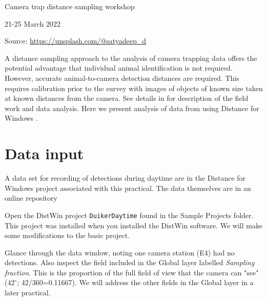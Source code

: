 \documentclass[a4paper, 10pt]{article}
\begin{document}
\phantom{a}

\vspace{4.7cm}

{\Large Camera trap distance sampling workshop}

{\large 21-25 March 2022}

\begin{flushright}
\tiny{Source: \url{https://unsplash.com/@satyadeep_d}}
\end{flushright}

%
{%
}

A distance sampling approach to the analysis of camera trapping data offers the potential advantage that individual animal identification is not required. However, accurate animal-to-camera detection distances are required. This requires calibration prior to the survey with images of objects of known size taken at known distances from the camera. See details in \citep{howeetal} for description of the field work and data analysis. Here we present analysis of data from \citep{howeetal} using Distance for Windows \citep{Thomas2010}. 

\section{Data input}

A data set for recording of detections during daytime are in the Distance for Windows project associated with this practical.  The data themselves are in an online repository \citep{dryad}

\begin{tcolorbox}[colback=yellow!5!white, colframe=yellow!60!black, title=Access duiker project]
Open the DistWin project \texttt{DuikerDaytime} found in the Sample Projects folder.  This project was installed when you installed the DistWin software.  We will make some modifications to the basic project.
\end{tcolorbox}

Glance through the data window, noting one camera station (E4) had no detections.  Also inspect the field included in the Global layer labelled \emph{Sampling fraction}.  This is the proportion of the full field of view that the camera can "see" ($42^\circ$; 42/360=0.11667). We will address the other fields in the Global layer in a later practical.
\end{document}
